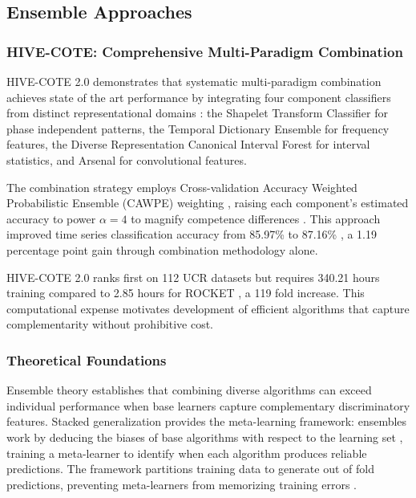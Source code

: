 \documentclass[pdflatex,sn-basic]{sn-jnl}           %
\theoremstyle{thmstyleone}%
\theoremstyle{thmstyletwo}%
\theoremstyle{thmstylethree}%
\begin{document}
\subsection{Ensemble Approaches}

\subsubsection{HIVE-COTE: Comprehensive Multi-Paradigm Combination}

HIVE-COTE 2.0 demonstrates that systematic multi-paradigm combination achieves state of the art performance by integrating four component classifiers from distinct representational domains \citep[p.~3]{hive-cote-2}: the Shapelet Transform Classifier for phase independent patterns, the Temporal Dictionary Ensemble for frequency features, the Diverse Representation Canonical Interval Forest for interval statistics, and Arsenal for convolutional features.

The combination strategy employs Cross-validation Accuracy Weighted Probabilistic Ensemble (CAWPE) weighting \citep{cawpe}, raising each component's estimated accuracy to power $\alpha=4$ to magnify competence differences \citep[p.~1675]{cawpe}. This approach improved time series classification accuracy from 85.97\% to 87.16\% \citep[Figure~8, p.~1692]{cawpe}, a 1.19 percentage point gain through combination methodology alone.

HIVE-COTE 2.0 ranks first on 112 UCR datasets \citep[p.~3]{hive-cote-2} but requires 340.21 hours training compared to 2.85 hours for ROCKET \citep[Table~4, p.~18]{hive-cote-2}, a 119 fold increase. This computational expense motivates development of efficient algorithms that capture complementarity without prohibitive cost.

\subsubsection{Theoretical Foundations}

Ensemble theory establishes that combining diverse algorithms can exceed individual performance when base learners capture complementary discriminatory features. Stacked generalization \citep{stacked-generalization} provides the meta-learning framework: ensembles work by deducing the biases of base algorithms with respect to the learning set \citep[p.~241]{stacked-generalization}, training a meta-learner to identify when each algorithm produces reliable predictions. The framework partitions training data to generate out of fold predictions, preventing meta-learners from memorizing training errors \citep[p.~244]{stacked-generalization}.
\end{document}
